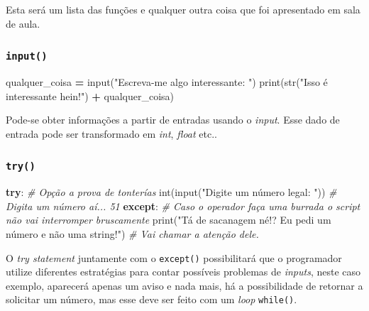 \documentclass[]{book}
\newenvironment{Shaded}{\begin{snugshade}}{\end{snugshade}}
\newcommand{\StringTok}[1]{\textcolor[rgb]{0.31,0.60,0.02}{#1}}
\newcommand{\CommentTok}[1]{\textcolor[rgb]{0.56,0.35,0.01}{\textit{#1}}}
\newcommand{\ControlFlowTok}[1]{\textcolor[rgb]{0.13,0.29,0.53}{\textbf{#1}}}
\newcommand{\OperatorTok}[1]{\textcolor[rgb]{0.81,0.36,0.00}{\textbf{#1}}}
\newcommand{\BuiltInTok}[1]{#1}
\newcommand{\NormalTok}[1]{#1}
\begin{document}
Esta será um lista das funções e qualquer outra coisa que foi
apresentado em sala de aula.

\subsubsection{\texorpdfstring{\texttt{input()}}{input()}}\label{input}

\begin{Shaded}
\begin{Highlighting}[]
\NormalTok{qualquer_coisa }\OperatorTok{=} \BuiltInTok{input}\NormalTok{(}\StringTok{"Escreva-me algo interessante: "}\NormalTok{)}
\BuiltInTok{print}\NormalTok{(}\BuiltInTok{str}\NormalTok{(}\StringTok{"Isso é interessante hein!"}\NormalTok{) }\OperatorTok{+}\NormalTok{ qualquer_coisa)}
\end{Highlighting}
\end{Shaded}

Pode-se obter informações a partir de entradas usando o \emph{input}.
Esse dado de entrada pode ser transformado em \emph{int}, \emph{float}
etc..

\subsubsection{\texorpdfstring{\texttt{try()}}{try()}}\label{try}

\begin{Shaded}
\begin{Highlighting}[]
\ControlFlowTok{try}\NormalTok{:     }\CommentTok{# Opção a prova de tonterías}
    \BuiltInTok{int}\NormalTok{(}\BuiltInTok{input}\NormalTok{(}\StringTok{"Digite um número legal: "}\NormalTok{))  }\CommentTok{# Digita um número aí... 51}
\ControlFlowTok{except}\NormalTok{:  }\CommentTok{# Caso o operador faça uma burrada o script não vai interromper bruscamente}
    \BuiltInTok{print}\NormalTok{(}\StringTok{"Tá de sacanagem né!? Eu pedi um número e não uma string!"}\NormalTok{)  }\CommentTok{# Vai chamar a atenção dele.}
\end{Highlighting}
\end{Shaded}

O \emph{try statement} juntamente com o \texttt{except()} possibilitará
que o programador utilize diferentes estratégias para contar possíveis
problemas de \emph{inputs}, neste caso exemplo, aparecerá apenas um
aviso e nada mais, há a possibilidade de retornar a solicitar um número,
mas esse deve ser feito com um \emph{loop} \texttt{while()}.
\end{document}
